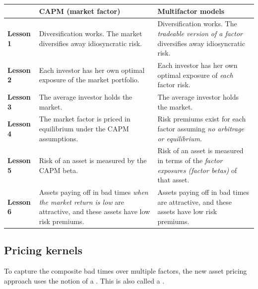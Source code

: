 \renewcommand{\arraystretch}{1.25}
\noindent\begin{tabularx}{\textwidth}{@{}p{1.5cm}XX@{}}
\toprule
& \textbf{\sffamily\small CAPM (market factor)} & \textbf{\sffamily\small Multifactor models} \\
\midrule
\textbf{Lesson 1} & Diversification works. The market diversifies away idiosyncratic risk. & Diversification works. The \emph{tradeable version of a factor} diversifies away idiosyncratic risk. \\
\textbf{Lesson 2} & Each investor has her own optimal exposure of the market portfolio. & Each investor has her own optimal exposure of \emph{each} factor risk. \\
\textbf{Lesson 3} & The average investor holds the market. & The average investor holds the market. \\
\textbf{Lesson 4} & The market factor is priced in equilibrium under the CAPM assumptions. & Risk premiums exist for each factor assuming \emph{no arbitrage or equilibrium}. \\
\textbf{Lesson 5} & Risk of an asset is measured by the CAPM beta. & Risk of an asset is measured in terms of the \emph{factor exposures (factor betas)} of that asset. \\
\textbf{Lesson 6} & Assets paying off in bad times \emph{when the market return is low} are attractive, and these assets have low risk premiums. & Assets paying off in bad times are attractive, and these assets have low risk premiums. \\
\bottomrule
\end{tabularx}
\renewcommand{\arraystretch}{1}


\subsection{Pricing kernels}

To capture the composite bad times over multiple factors, the new asset pricing
approach uses the notion of a . This is also called a
.

